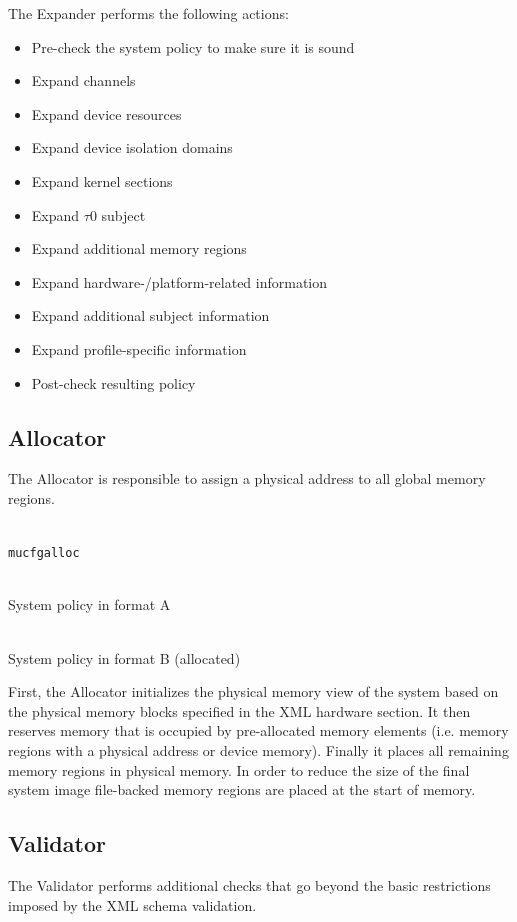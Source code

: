 \documentclass[a4paper,twoside,titlepage]{article}
\begin{document}
The Expander performs the following actions:
\begin{itemize}
	\item Pre-check the system policy to make sure it is sound
	\item Expand channels
	\item Expand device resources
	\item Expand device isolation domains
	\item Expand kernel sections
	\item Expand $\tau$0 subject
	\item Expand additional memory regions
	\item Expand hardware-/platform-related information
	\item Expand additional subject information
	\item Expand profile-specific information
	\item Post-check resulting policy
\end{itemize}

\subsection{Allocator}
\label{sec:tools-allocator}
The Allocator is responsible to assign a physical address to all global memory
regions.

\begin{description} \itemsep1pt \parskip0pt
	\item[Name] \hfill \\
		\texttt{mucfgalloc}
	\item[Input] \hfill \\
		System policy in format A
	\item[Output] \hfill \\
		System policy in format B (allocated)
\end{description}

First, the Allocator initializes the physical memory view of the system based
on the physical memory blocks specified in the XML hardware section. It then
reserves memory that is occupied by pre-allocated memory elements (i.e. memory
regions with a physical address or device memory).  Finally it places all
remaining memory regions in physical memory.  In order to reduce the size of
the final system image file-backed memory regions are placed at the start of
memory.

\subsection{Validator}
\label{sec:tools-validator}
The Validator performs additional checks that go beyond the basic restrictions
imposed by the XML schema validation.
\end{document}
